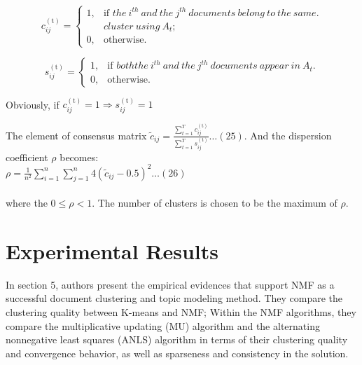 \documentclass[11pt, oneside]{article}   	%
\begin{document}
\begin{equation}\tag{23}
  c^{\mathrm{(t)}}_{ij} =\begin{cases}
    1, & \text{if $the\ i^{th}\ and \ the \ j^{th} \ documents\ belong\ to \ the \ same$}.\\
    &cluster\ using \ A_t;\\
    0, & \text{otherwise}.
  \end{cases}
\end{equation}

\begin{equation}\tag{24}
  s^{\mathrm{(t)}}_{ij} =\begin{cases}
    1, & \text{if $both the\ i^{th}\ and \ the \ j^{th} \ documents\ appear \ in \ A_t$}.\\
    0, & \text{otherwise}.
  \end{cases}
\end{equation}

Obviously, if $c^{\mathrm{(t)}}_{ij} =1 \Rightarrow s^{\mathrm{(t)}}_{ij} =1$

The element of consensus matrix $\tilde{c}_{ij}=\frac{\sum_{t=1}^T c^{\mathrm{(t)}}_{ij} }{\sum_{t=1}^T s^{\mathrm{(t)}}_{ij} }\ldots(25)$.  And the dispersion coefficient $\rho$ becomes: \\

\hspace{120pt} $\rho=\frac{1}{n^2}\sum_{i=1}^n\sum_{j=1}^n4(\tilde{c}_{ij}-0.5)^2\ldots(26)$\\
\\where the $0\leq\rho<1$.  The number of clusters is chosen to be the maximum of $\rho$.

\section{Experimental Results}
In section 5, authors  present the empirical evidences that support NMF as a successful document clustering and topic modeling method. They compare the clustering quality between K-means and NMF; Within the NMF algorithms, they compare the multiplicative updating (MU) algorithm and the alternating nonnegative least squares (ANLS) algorithm in terms of their clustering quality and convergence behavior, as well as sparseness and consistency in the solution.  
\end{document}
